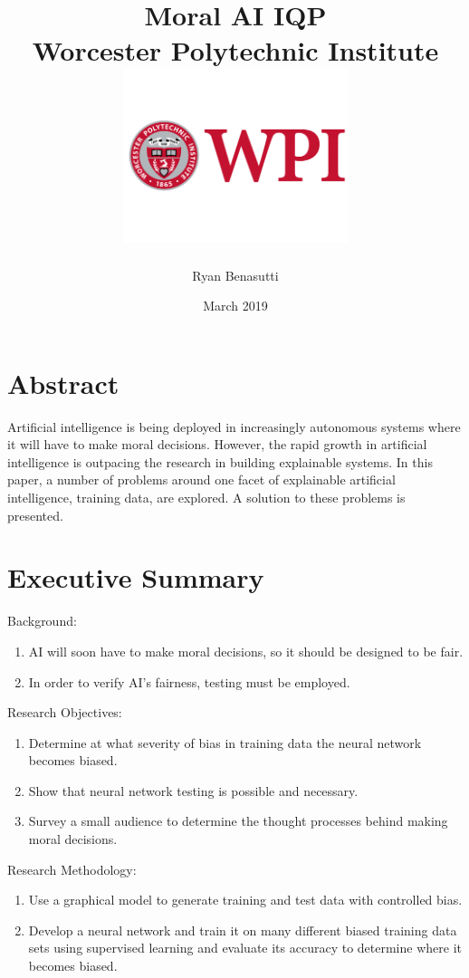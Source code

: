 \documentclass{report}
\title{
    {Moral AI IQP}\\
    {\large Worcester Polytechnic Institute}\\
    {\includegraphics[height=2in]{figures/WPI_Inst_Prim_FulClr.png}}
}
\author{Ryan Benasutti}
\date{March 2019}
\begin{document}
\maketitle

\clearpage
\mbox{}
\clearpage

\chapter*{Abstract}

Artificial intelligence is being deployed in increasingly autonomous systems where it will have to
make moral decisions. However, the rapid growth in artificial intelligence is outpacing the
research in building explainable systems. In this paper, a number of problems around one facet of
explainable artificial intelligence, training data, are explored. A solution to these problems is
presented.

\chapter*{Executive Summary}

Background:
\begin{enumerate}
    \item AI will soon have to make moral decisions, so it should be designed to be fair.
    \item In order to verify AI's fairness, testing must be employed.
\end{enumerate}

Research Objectives:
\begin{enumerate}
    \item Determine at what severity of bias in training data the neural network becomes biased.
    \item Show that neural network testing is possible and necessary.
    \item Survey a small audience to determine the thought processes behind making moral decisions.
\end{enumerate}

Research Methodology:
\begin{enumerate}
    \item Use a graphical model to generate training and test data with controlled bias.
    
    \item Develop a neural network and train it on many different biased training data sets using
    supervised learning and evaluate its accuracy to determine where it becomes biased.
\end{enumerate}
\end{document}
